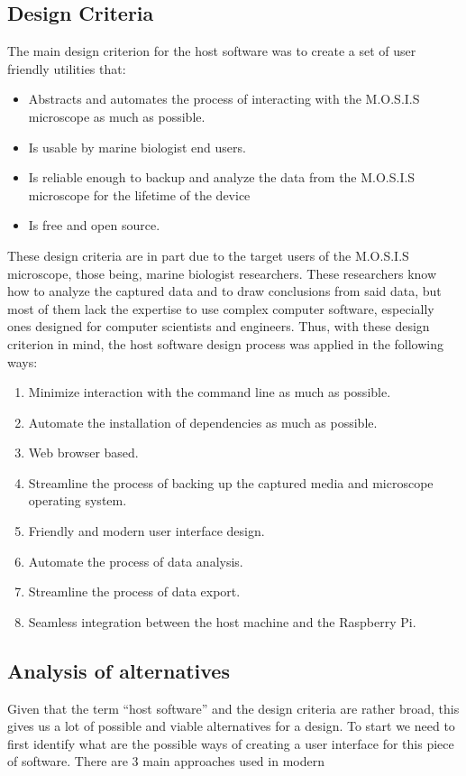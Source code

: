 \documentclass[12pt]{article}
\begin{document}
\subsection{Design Criteria}
The main design criterion for the host software was to create a set of user friendly utilities that:
\begin{itemize}
	\item Abstracts and automates the process of interacting with the M.O.S.I.S microscope as much as possible.
	\item Is usable by marine biologist end users.
	\item Is reliable enough to backup and analyze the data from the M.O.S.I.S microscope for the lifetime of the device
	\item Is free and open source.
\end{itemize}
These design criteria are in part due to the target users of the M.O.S.I.S microscope, those being, marine biologist researchers. These researchers know how to analyze the captured data and to draw conclusions from said data, but most of them lack the expertise to use complex computer software, especially ones designed for computer scientists and engineers. Thus, with these design criterion in mind, the host software design process was applied in the following ways:
\begin{enumerate}
	\item Minimize interaction with the command line as much as possible.
	\item Automate the installation of dependencies as much as possible.
	\item Web browser based.
	\item Streamline the process of backing up the captured media and microscope operating system.
	\item Friendly and modern user interface design.
	\item Automate the process of data analysis.
	\item Streamline the process of data export.
	\item Seamless integration between the host machine and the Raspberry Pi.
\end{enumerate}
\subsection{Analysis of alternatives}
Given that the term ``host software'' and the design criteria are rather broad, this gives us a lot of possible and viable alternatives for a design. To start we need to first identify what are the possible ways of creating a user interface for this piece of software. There are 3 main approaches used in modern 
\end{document}
